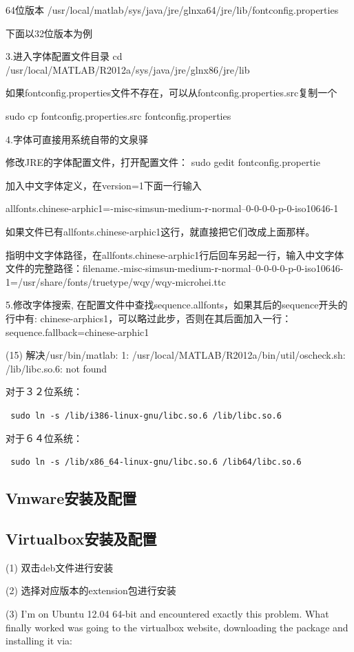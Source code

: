 64位版本 /usr/local/matlab/sys/java/jre/glnxa64/jre/lib/fontconfig.properties

下面以32位版本为例

3.进入字体配置文件目录 cd /usr/local/MATLAB/R2012a/sys/java/jre/glnx86/jre/lib

如果fontconfig.properties文件不存在，可以从fontconfig.properties.src复制一个

sudo cp fontconfig.properties.src fontconfig.properties

4.字体可直接用系统自带的文泉驿

修改JRE的字体配置文件，打开配置文件： sudo gedit fontconfig.propertie

加入中文字体定义，在version=1下面一行输入

allfonts.chinese-arphic1=-misc-simsun-medium-r-normal--0-0-0-0-p-0-iso10646-1

如果文件已有allfonts.chinese-arphic1这行，就直接把它们改成上面那样。

指明中文字体路径，在allfonts.chinese-arphic1行后回车另起一行，输入中文字体文件的完整路径：filename.-misc-simsun-medium-r-normal--0-0-0-0-p-0-iso10646-1=/usr/share/fonts/truetype/wqy/wqy-microhei.ttc

5.修改字体搜索, 在配置文件中查找sequence.allfonts，如果其后的sequence开头的行中有: chinese-arphics1，可以略过此步，否则在其后面加入一行：sequence.fallback=chinese-arphic1

(15) 解决/usr/bin/matlab: 1: /usr/local/MATLAB/R2012a/bin/util/oscheck.sh: /lib/libc.so.6: not found

对于３２位系统：

\verb" sudo ln -s /lib/i386-linux-gnu/libc.so.6 /lib/libc.so.6"

对于６４位系统：

\verb" sudo ln -s /lib/x86_64-linux-gnu/libc.so.6 /lib64/libc.so.6"

\subsection{Vmware安装及配置}

\subsection{Virtualbox安装及配置}
(1) 双击deb文件进行安装

(2) 选择对应版本的extension包进行安装

(3) I'm on Ubuntu 12.04 64-bit and encountered exactly this problem. What finally worked was going to the virtualbox website, downloading the package and installing it via:

